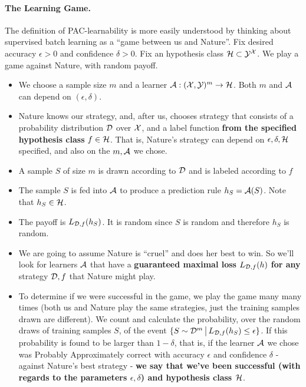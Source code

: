 \paragraph{The Learning Game.} 
The definition of PAC-learnability is more easily understood by thinking about
supervised batch learning as a ``game between us and Nature''. 
Fix desired accuracy $\epsilon>0$ and confidence $\delta>0$. Fix
   an hypothesis class $\mathcal{H} \subset \mathcal{Y}^{\mathcal{X}}$. 
 We play a game against Nature, with random payoff.
  \begin{itemize}
    \item We choose a sample size $m$ and a learner $\mathcal{A}:(\mathcal{X},\mathcal{Y})^m \to \mathcal{H}$. 
    Both $m$ and $\mathcal{A}$ can depend on $(\epsilon,\delta)$.
       \item Nature knows our strategy, and, after us, chooses strategy that consists of a probability distribution $\mathcal{D}$ over $\mathcal{X}$, and a label function {\bf from the specified hypothesis class} $f\in\mathcal{H}$. 
     That is, Nature's strategy can depend on $\epsilon,\delta,\mathcal{H}$ specified, and also on the $m,\mathcal{A}$ we chose. 
    \item A sample $S$ of size $m$ is drawn according to $\mathcal{D}$ and is labeled
      according to $f$
    \item The sample $S$ is fed into $\mathcal{A}$ to produce a prediction rule
      $h_S=\mathcal{A}(S)$. Note that $h_S\in\mathcal{H}$.
    \item The payoff is $L_{\mathcal{D},f}(h_S)$. It is random since $S$ is random and
      therefore $h_S$ is random.
    \item We are going to assume Nature is ``cruel'' and does her best to win.
      So we'll look for learners $\mathcal{A}$ that have a {\bf guaranteed maximal 
      loss} $L_{\mathcal{D},f}(h)$ {\bf for any} strategy $\mathcal{D},f$ that Nature might play.
      \item To determine if we were successful in the game, we play the game many many times 
      (both us and Nature play the same strategies, just the training samples drawn are different).
      We count and calculate the probability, over the random draws of training samples $S$, of the event
      $\{ S \sim \mathcal{D}^m \,\big |\,L_{\mathcal{D},f}(h_S)\leq \epsilon \}$. If this probability is found to be 
      larger than $1-\delta$, that is, if 
      the learner $\mathcal{A}$ we chose was Probably Approximately correct with accuracy $\epsilon$ and confidence $\delta$ - against Nature's best strategy - {\bf we say that we've been successful (with regards to the parameters $\epsilon,\delta$) and hypothesis class $\mathcal{H}$}.
\end{itemize}


